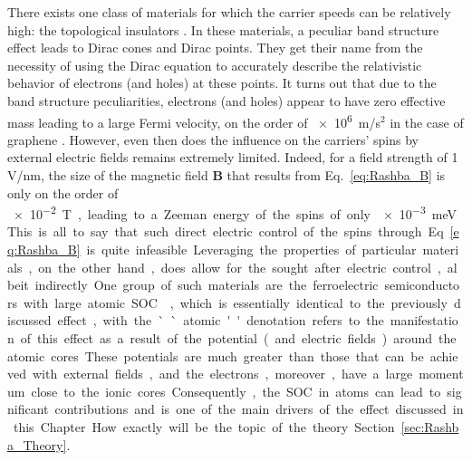 There exists one class of materials for which the carrier speeds can be relatively high: the topological insulators \cite{Kane2005a,Novoselov2005,CastroNeto2009,Fu2007,Fu2006,Pesin2012}.
In these materials, a peculiar band structure effect leads to Dirac cones and Dirac points. They get their name from the necessity of using the Dirac equation to accurately describe the relativistic behavior of electrons (and holes) at these points.
It turns out that due to the band structure peculiarities, electrons (and holes) appear to have zero effective mass leading to a large Fermi velocity, on the order of \SI{e6}m/s$^2$ in the case of graphene \cite{Novoselov2005}.   
However, even then does the influence on the carriers' spins by external electric fields remains extremely limited.
Indeed, for a field strength of 1 V/nm, the size of the magnetic field $\bm B$ that results from Eq.~\eqref{eq:Rashba_B} is only on the order of \SI{e-2} T, leading to a Zeeman energy of the spins of only \SI{e-3} meV.
This is all to say that such direct electric control of the spins through Eq.~\eqref{eq:Rashba_B} is quite infeasible.

Leveraging the properties of particular materials, on the other hand, does allow for the sought after electric control, albeit indirectly.
One group of such materials are the ferroelectric semiconductors with large atomic \gls{SOC} \cite{Picozzi2014,DiSante2013,Ishizaka2011,Kim2014}, which is essentially identical to the previously discussed effect, with the ``atomic'' denotation refers to the manifestation of this effect as a result of the potential (and electric fields) around the atomic cores.
These potentials are much greater than those that can be achieved with external fields, and the electrons, moreover, have a large momentum close to the ionic cores.
Consequently, the \gls{SOC} in atoms can lead to significant contributions and is one of the main drivers of the effect discussed in this Chapter.
How exactly will be the topic of the theory Section~\ref{sec:Rashba_Theory}.

